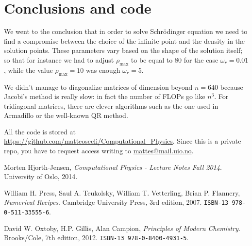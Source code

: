 \documentclass {article}
\begin{document}
\section{Conclusions and code}
We went to the conclusion that in order to solve Schr\"{o}dinger equation we need to find a compromise between the choice of the infinite point and the density in the solution points. These parameters vary based on the shape of the solution itself; so that for instance we had to adjust $\rho_{\max}$ to be equal to $80$ for the case $\omega_r = 0.01$, while the value $\rho_{\max}=10$ was enough $\omega_r = 5$.

We didn't manage to diagonalize matrices of dimension beyond $n=640$ because Jacobi's method is really slow: in fact the number of FLOPs go like $n^3$. For tridiagonal matrices, there are clever algorithms such as the one used in Armadillo or the well-known QR method.

All the code is stored at \url{https://github.com/matteosecli/Computational_Physics}. Since this is a private repo, you have to request access writing to \href{mailto:mattes@mail.uio.no}{mattes@mail.uio.no}.


\begin{thebibliography}{9}

  Morten Hjorth-Jensen,
  \emph{Computational Physics - Lecture Notes Fall 2014}.
  University of Oslo, 
  2014. 

  William H. Press, Saul A. Teukolsky, William T. Vetterling, Brian P. Flannery,
  \emph{Numerical Recipes}.
  Cambridge University Press,
  3rd edition,
  2007.
  \texttt{ISBN-13 978-0-511-33555-6}.
  
  David W. Oxtoby, H.P. Gillis, Alan Campion,
  \emph{Principles of Modern Chemistry}.
  Brooks/Cole,
  7th edition,
  2012.
  \texttt{ISBN-13 978-0-8400-4931-5}.

\end{thebibliography}
\end{document}
